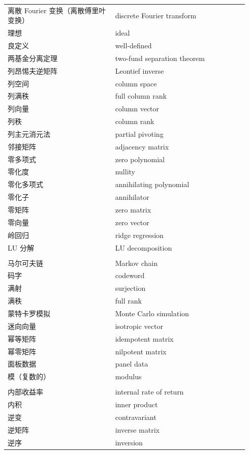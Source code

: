 {\begin{longtable}{p{0.42\linewidth}p{0.52\linewidth}}
		离散 Fourier 变换（离散傅里叶变换） & discrete Fourier transform \\
		理想 & ideal \\
		良定义 & well-defined \\
		两基金分离定理 & two-fund separation theorem \\
		列昂惕夫逆矩阵 & Leontief inverse \\
		列空间 & column space \\
		列满秩 & full column rank \\
		列向量 & column vector \\
		列秩 & column rank \\
		列主元消元法 & partial pivoting \\
		邻接矩阵 & adjacency matrix \\
		零多项式 & zero polynomial \\
		零化度 & nullity \\
		零化多项式 & annihilating polynomial \\
		零化子 & annihilator \\
		零矩阵 & zero matrix \\
		零向量 & zero vector \\
		岭回归 & ridge regression \\
		LU 分解 & LU decomposition \\
		\addlinespace
		\multicolumn{2}{l}{\textbf{\sffamily M}} \\
		马尔可夫链 & Markov chain \\
		码字 & codeword \\
		满射 & surjection \\
		满秩 & full rank \\
		蒙特卡罗模拟 & Monte Carlo simulation \\
		迷向向量 & isotropic vector \\
		幂等矩阵 & idempotent matrix \\
		幂零矩阵 & nilpotent matrix \\
		面板数据 & panel data \\
		模（复数的） & modulus \\
		\addlinespace
		\multicolumn{2}{l}{\textbf{\sffamily N}} \\
		内部收益率 & internal rate of return \\
		内积 & inner product \\
		逆变 & contravariant \\
		逆矩阵 & inverse matrix \\
		逆序 & inversion \\

\end{longtable}}
